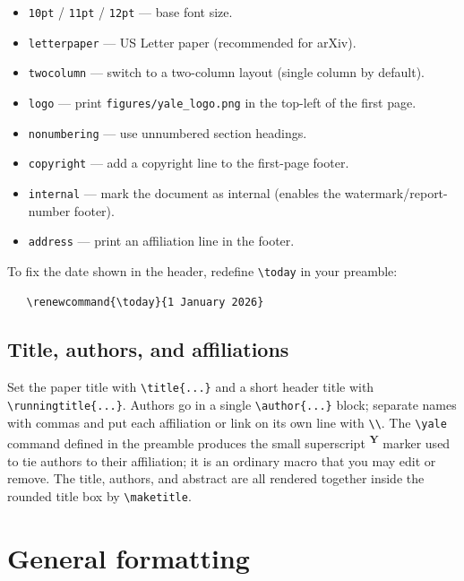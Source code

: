 \documentclass[11pt,letterpaper,logo]{yalearxiv}
\newcommand{\yale}{%
  \textsuperscript{%
    {\usefont{T1}{pbk}{m}{n}\textcolor{yaleblue}{\textbf{Y}}}%
  }%
}
\begin{document}
\begin{itemize}
  \item \verb+10pt+ / \verb+11pt+ / \verb+12pt+ --- base font size.
  \item \verb+letterpaper+ --- US Letter paper (recommended for arXiv).
  \item \verb+twocolumn+ --- switch to a two-column layout (single column by
    default).
  \item \verb+logo+ --- print \verb+figures/yale_logo.png+ in the top-left of the
    first page.
  \item \verb+nonumbering+ --- use unnumbered section headings.
  \item \verb+copyright+ --- add a copyright line to the first-page footer.
  \item \verb+internal+ --- mark the document as internal (enables the
    watermark/report-number footer).
  \item \verb+address+ --- print an affiliation line in the footer.
\end{itemize}

To fix the date shown in the header, redefine \verb+\today+ in your preamble:
\begin{verbatim}
   \renewcommand{\today}{1 January 2026}
\end{verbatim}

\subsection{Title, authors, and affiliations}
\label{sec:title}

Set the paper title with \verb+\title{...}+ and a short header title with
\verb+\runningtitle{...}+. Authors go in a single \verb+\author{...}+ block;
separate names with commas and put each affiliation or link on its own line with
\verb+\\+. The \verb+\yale+ command defined in the preamble produces the small
superscript \yale{} marker used to tie authors to their affiliation; it is an
ordinary macro that you may edit or remove. The title, authors, and abstract are
all rendered together inside the rounded title box by \verb+\maketitle+.


\section{General formatting}
\label{sec:format}
\end{document}
